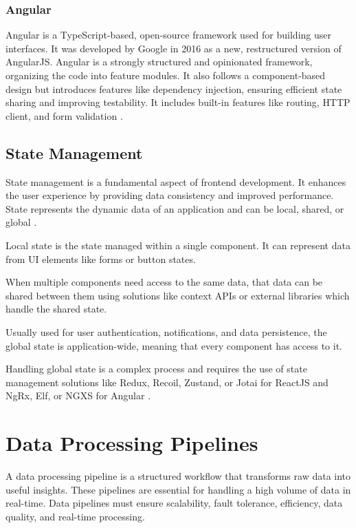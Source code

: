 \subsubsection{Angular}
Angular is a TypeScript-based, open-source framework used for building user
interfaces. It was developed by Google in 2016 as a new, restructured version
of AngularJS. Angular is a strongly structured and opinionated framework,
organizing the code into feature modules. It also follows a component-based
design but introduces features like dependency injection, ensuring efficient
state sharing and improving testability.
It includes built-in features like routing, \gls{HTTP} client, and form validation \cite{Alves}.

\subsection{State Management}
State management is a fundamental aspect of frontend development. It enhances
the user experience by providing data consistency and improved performance.
State represents the dynamic data of an application and can be local, shared,
or global \cite{tran2023state}.

Local state is the state managed within a single component. It can
represent data from \gls{UI} elements like forms or button states.

When multiple components need access to the same data, that data can be shared
between them using solutions like context \gls{API}s or external libraries which
handle the shared state.

Usually used for user authentication, notifications, and
data persistence, the global state is application-wide, meaning that
every component has access to it.

Handling global state is a complex process and requires the use of state
management solutions like Redux, Recoil, Zustand, or Jotai for ReactJS and
NgRx, Elf, or NGXS for Angular \cite{tran2023state}.

\section{Data Processing Pipelines}
A data processing pipeline is a structured workflow that transforms raw data
into useful insights. These pipelines are essential for handling a high volume
of data in real-time. Data pipelines must ensure scalability, fault tolerance,
efficiency, data quality, and real-time processing.

